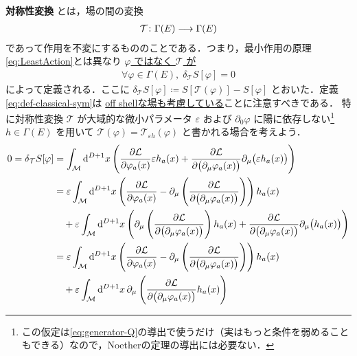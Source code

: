 \documentclass[TQFT_main]{subfiles}
\begin{document}
\textbf{対称性変換}
とは，場の間の変換
\begin{align}
    \mathcal{T} \colon \Gamma(E) \longrightarrow \Gamma(E)
\end{align}
であって作用を不変にするもののことである．つまり，最小作用の原理\eqref{eq:LeastAction}とは異なり \underline{$\varphi$ ではなく $\mathcal{T}$ が}
\begin{align}
    \label{eq:def-classical-sym}
    \forall \varphi \in \Gamma(E),\; \delta_{\mathcal{T}} S[\varphi] = 0
\end{align}
によって定義される．ここに $\delta_{\mathcal{T}} S[\varphi] \coloneqq S[\mathcal{T}(\varphi)] - S[\varphi]$ とおいた．定義\eqref{eq:def-classical-sym}は \underline{off shellな場も考慮している}ことに注意すべきである．
特に対称性変換 $\mathcal{T}$ が大域的な微小パラメータ $\varepsilon$ および $\partial_0 \varphi$ に陽に依存しない\footnote{この仮定は\eqref{eq:generator-Q}の導出で使うだけ（実はもっと条件を弱めることもできる）なので，Noetherの定理の導出には必要ない．} $h \in \Gamma(E)$ を用いて $\mathcal{T}(\varphi) = \mathcal{T}_{\varepsilon h}(\varphi)$ と書かれる場合を考えよう．
\begin{align}
    0 = \delta_{\mathcal{T}} S[\varphi]
    &= \int_{\mathcal{M}} \dd[D+1]{x} \left( \pdv{\mathcal{L}}{\varphi_a(x)} \varepsilon h_a (x) + \pdv{\mathcal{L}}{\bigl(\partial_\mu \varphi_a(x)\bigr)} \partial_\mu \bigl(\varepsilon h_a(x)\bigr) \right) \\
    &= \varepsilon \int_{\mathcal{M}} \dd[D+1]{x} \left( \pdv{\mathcal{L}}{\varphi_a(x)} - \partial_\mu \left(\pdv{\mathcal{L}}{\bigl(\partial_\mu\varphi_a(x)\bigr)}\right) \right) h_a(x) \\
    &\quad + \varepsilon \int_{\mathcal{M}} \dd[D+1]{x} \left(\partial_\mu \left(\pdv{\mathcal{L}}{\bigl(\partial_\mu\varphi_a(x)\bigr)}\right) h_a (x) + \pdv{\mathcal{L}}{\bigl(\partial_\mu \varphi_a(x)\bigr)} \partial_\mu \bigl(h_a(x)\bigr) \right) \\
    &= \varepsilon \int_{\mathcal{M}} \dd[D+1]{x} \left( \pdv{\mathcal{L}}{\varphi_a(x)} - \partial_\mu \left(\pdv{\mathcal{L}}{\bigl(\partial_\mu\varphi_a(x)\bigr)}\right) \right) h_a(x) \\
    &\quad + \varepsilon \int_{\mathcal{M}} \dd[D+1]{x} \partial_\mu \left(\pdv{\mathcal{L}}{\bigl(\partial_\mu\varphi_a(x)\bigr)} h_a (x)\right)
\end{align}
\end{document}
